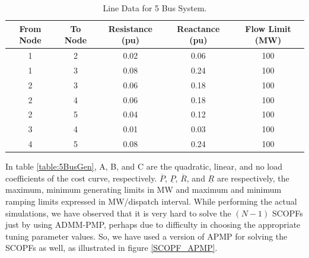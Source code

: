 \documentclass[preprint,12pt,3p]{elsarticle}
\begin{document}
\begin{table}[ht] 

\caption{Line Data for 5 Bus System.} %

\centering %

\begin{tabular}{| c | c | c | c | c |} %

\hline\hline %

From Node & To Node & Resistance (pu) & Reactance (pu)  & Flow Limit (MW) \\ [0.5ex] %


\hline %
1  &	2  &	0.02  &	0.06  &		100 \\ [0.5ex] %
\hline
1  &	3  &	0.08  &	0.24  &		100 \\ [0.5ex] %
\hline
2  &	3  &	0.06  &	0.18  &		100 \\ [0.5ex] %
\hline
2  &	4  &	0.06  &	0.18  &		100 \\ [0.5ex] %
\hline
2  &	5  &	0.04  &	0.12  &		100 \\ [0.5ex] %
\hline
3  &	4  &	0.01  &	0.03  &		100 \\ [0.5ex] %
\hline
4  &	5  &	0.08  &	0.24  &		100 \\ [0.5ex] %
\hline
\end{tabular} 

\label{table:5BusLine} %

\end{table}
In table \ref{table:5BusGen}, A, B, and C are the quadratic, linear, and no load coefficients of the cost curve, respectively. $\overline{P}$, $\underline{P}$, $\overline{R}$, and $\underline{R}$ are respectively, the maximum, minimum generating limits in MW and maximum and minimum ramping limits expressed in MW/dispatch interval. While performing the actual simulations, we have observed that it is very hard to solve the $(N-1)$ SCOPFs just by using ADMM-PMP, perhaps due to difficulty in choosing the appropriate tuning parameter values. So, we have used a version of APMP for solving the SCOPFs as well, as illustrated in figure \ref{SCOPF_APMP}. 
\end{document}
